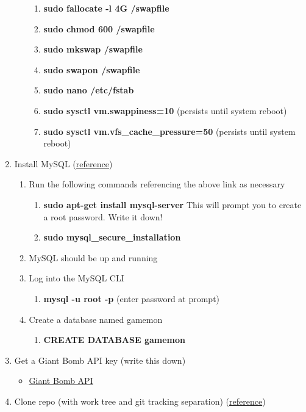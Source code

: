 \documentclass{article}
\begin{document}
\begin{enumerate}
\begin{enumerate}
\begin{enumerate}
      \item \textbf{sudo fallocate -l 4G /swapfile}
      \item \textbf{sudo chmod 600 /swapfile}
      \item \textbf{sudo mkswap /swapfile}
      \item \textbf{sudo swapon /swapfile}
      \item \textbf{sudo nano /etc/fstab}
      \item \textbf{sudo sysctl vm.swappiness=10} (persists until system reboot)
      \item \textbf{sudo sysctl vm.vfs\_cache\_pressure=50} (persists until system reboot)
    \end{enumerate}
  \end{enumerate}
  \item Install MySQL (\href{https://www.digitalocean.com/community/tutorials/how-to-install-mysql-on-ubuntu-16-04}{reference})
  \begin{enumerate}
    \item Run the following commands referencing the above link as necessary
    \begin{enumerate}
      \item \textbf{sudo apt-get install mysql-server} This will prompt you to create a root password. Write it down!
      \item \textbf{sudo mysql\_secure\_installation}
    \end{enumerate}
    \item MySQL should be up and running
    \item Log into the MySQL CLI
    \begin{enumerate}
      \item \textbf{mysql -u root -p} (enter password at prompt)
    \end{enumerate}
    \item Create a database named gamemon
    \begin{enumerate}
      \item \textbf{CREATE DATABASE gamemon}
    \end{enumerate}
  \end{enumerate}
  \item Get a Giant Bomb API key (write this down)
  \begin{itemize}
    \item \href{http://www.giantbomb.com/api/}{Giant Bomb API}
  \end{itemize}
  \item Clone repo (with work tree and git tracking separation) (\href{https://www.digitalocean.com/community/tutorials/how-to-set-up-automatic-deployment-with-git-with-a-vps}{reference})

\end{enumerate}
\end{document}
